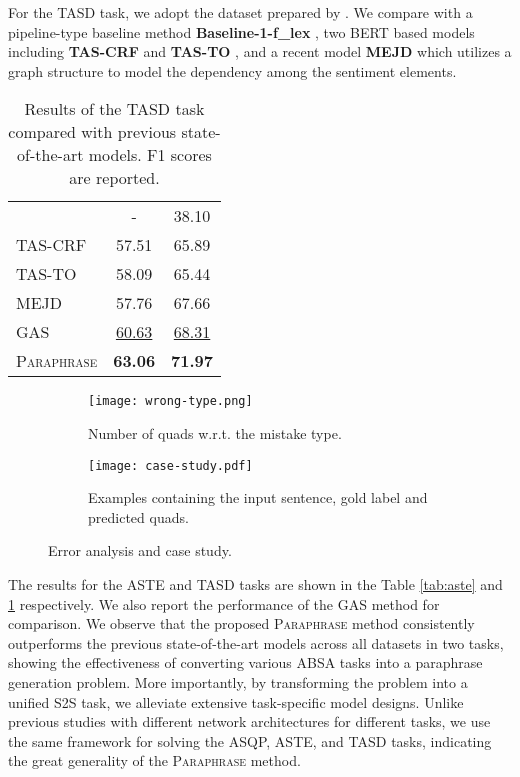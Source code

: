 \documentclass[11pt]{article}
\begin{document}
For the TASD task, we adopt the dataset prepared by \citet{aaai20-tasd}. We compare with a pipeline-type baseline method \textbf{Baseline-1-f\_lex} \cite{tasd-baseline}, two BERT based models including \textbf{TAS-CRF} and \textbf{TAS-TO} \cite{aaai20-tasd}, and a recent model \textbf{MEJD} \cite{kbs21-mejd-tasd} which utilizes a graph structure to model the dependency among the sentiment elements.


\begin{table}[!t]
    \centering
    \resizebox{0.85\columnwidth}{!}
    {
    \begin{tabular}{lcc}
    \toprule
    &  & \\
    \midrule
    \citet{tasd-baseline}  & - & 38.10     \\
    TAS-CRF  \cite{aaai20-tasd}    & 57.51 & 65.89 \\
    TAS-TO   \cite{aaai20-tasd}    & 58.09 & 65.44 \\
    MEJD    \cite{kbs21-mejd-tasd}      & 57.76 & 67.66 \\
    \midrule
    GAS & \underline{60.63} & \underline{68.31} \\
    \textsc{Paraphrase} & \textbf{63.06} & \textbf{71.97} \\
    \bottomrule
    \end{tabular}}
    \caption{Results of the TASD task compared with previous state-of-the-art models. F1 scores are reported.} 
    \label{tab:tasd}
\end{table}


\begin{figure*}
     \centering
     \begin{subfigure}[b]{0.35\textwidth}
         \centering
         \texttt{[image: wrong-type.png]}
         \caption{Number of quads w.r.t. the mistake type.}
         \label{error-sentiment-type}
     \end{subfigure}\begin{subfigure}[b]{0.65\textwidth}
         \centering
         \texttt{[image: case-study.pdf]}
         \caption{Examples containing the input sentence, gold label and predicted quads.}
         \label{case-study}
     \end{subfigure}
     \caption{Error analysis and case study.}
     \label{graph-relations}
     \vspace{-0.3cm}
\end{figure*}


The results for the ASTE and TASD tasks are shown in the Table \ref{tab:aste} and \ref{tab:tasd} respectively. We also report the performance of the GAS method for comparison. We observe that the proposed \textsc{Paraphrase} method consistently outperforms the previous state-of-the-art models across all datasets in two tasks, showing the effectiveness of converting various ABSA tasks into a paraphrase generation problem. 
More importantly, by transforming the problem into a unified S2S task, we alleviate extensive task-specific model designs. Unlike previous studies with different network architectures for different tasks, we use the same framework for solving the ASQP, ASTE, and TASD tasks, indicating the great generality of the \textsc{Paraphrase} method.
\end{document}
